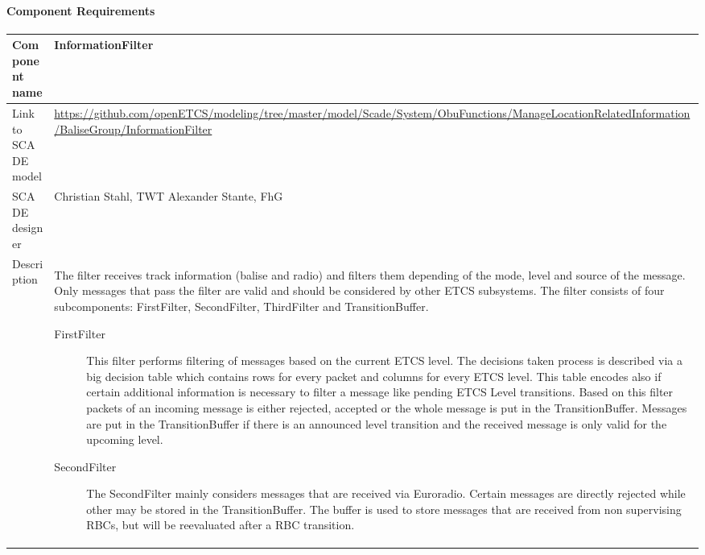 
\paragraph{Component Requirements}

\begin{longtable}{p{}p{}}
\toprule
Component name			& InformationFilter \\
\midrule
Link to SCADE model		& {\footnotesize \url{https://github.com/openETCS/modeling/tree/master/model/Scade/System/ObuFunctions/ManageLocationRelatedInformation/BaliseGroup/InformationFilter}} \\
\midrule
SCADE designer			& Christian Stahl, TWT\newline
Alexander Stante, FhG \\
\midrule
Description				& The filter receives track information (balise and radio) and filters them depending of the mode, level and source of the message. Only messages that pass the filter are valid and should be considered by other ETCS subsystems. The filter  consists of four subcomponents: FirstFilter, SecondFilter, ThirdFilter and TransitionBuffer.

\begin{description}
\item[FirstFilter] This filter performs filtering of messages
based on the current ETCS level. The decisions taken process is
described via a big decision table which contains rows for every
packet and columns for every ETCS level. This table encodes also if
certain additional information is necessary to filter a message like
pending ETCS Level transitions. Based on this filter packets of an
incoming message is either rejected, accepted or the whole message is
put in the TransitionBuffer. Messages are put in the TransitionBuffer
if there is an announced level transition and the received message is
only valid for the upcoming level.

\item[SecondFilter] The SecondFilter mainly considers messages
that are received via Euroradio. Certain messages are directly
rejected while other may be stored in the TransitionBuffer. The buffer
is used to store messages that are received from non supervising RBCs,
but will be reevaluated after a RBC transition.


\end{description}
\end{longtable}
